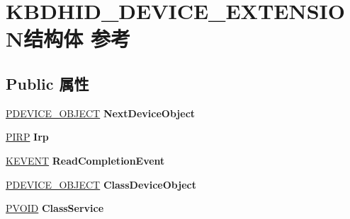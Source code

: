 \hypertarget{struct_k_b_d_h_i_d___d_e_v_i_c_e___e_x_t_e_n_s_i_o_n}{}\section{K\+B\+D\+H\+I\+D\+\_\+\+D\+E\+V\+I\+C\+E\+\_\+\+E\+X\+T\+E\+N\+S\+I\+O\+N结构体 参考}
\label{struct_k_b_d_h_i_d___d_e_v_i_c_e___e_x_t_e_n_s_i_o_n}
\subsection*{Public 属性}
\begin{DoxyCompactItemize}
\item 
\mbox{\label{struct_k_b_d_h_i_d___d_e_v_i_c_e___e_x_t_e_n_s_i_o_n_a37d49023ea520911fe054ba5e3263bea}} 
\hyperlink{struct___d_e_v_i_c_e___o_b_j_e_c_t}{P\+D\+E\+V\+I\+C\+E\+\_\+\+O\+B\+J\+E\+CT} {\bfseries Next\+Device\+Object}
\item 
\mbox{\label{struct_k_b_d_h_i_d___d_e_v_i_c_e___e_x_t_e_n_s_i_o_n_af43d87539f8d80af37d6dce9fb910e13}} 
\hyperlink{interfacevoid}{P\+I\+RP} {\bfseries Irp}
\item 
\mbox{\label{struct_k_b_d_h_i_d___d_e_v_i_c_e___e_x_t_e_n_s_i_o_n_a84228d2abbad84ab370a12cdb1097186}} 
\hyperlink{struct___k_e_v_e_n_t}{K\+E\+V\+E\+NT} {\bfseries Read\+Completion\+Event}
\item 
\mbox{\label{struct_k_b_d_h_i_d___d_e_v_i_c_e___e_x_t_e_n_s_i_o_n_a36a91cdbc36b61d80dfff42ea45df31e}} 
\hyperlink{struct___d_e_v_i_c_e___o_b_j_e_c_t}{P\+D\+E\+V\+I\+C\+E\+\_\+\+O\+B\+J\+E\+CT} {\bfseries Class\+Device\+Object}
\item 
\mbox{\label{struct_k_b_d_h_i_d___d_e_v_i_c_e___e_x_t_e_n_s_i_o_n_a15e9c4a73ceb07ffafb283c40f95c6cd}} 
\hyperlink{interfacevoid}{P\+V\+O\+ID} {\bfseries Class\+Service}
\item 
\mbox{\label{struct_k_b_d_h_i_d___d_e_v_i_c_e___e_x_t_e_n_s_i_o_n_a22399f150e1a281d0eb31874781bc371}} 

\end{DoxyCompactItemize}
